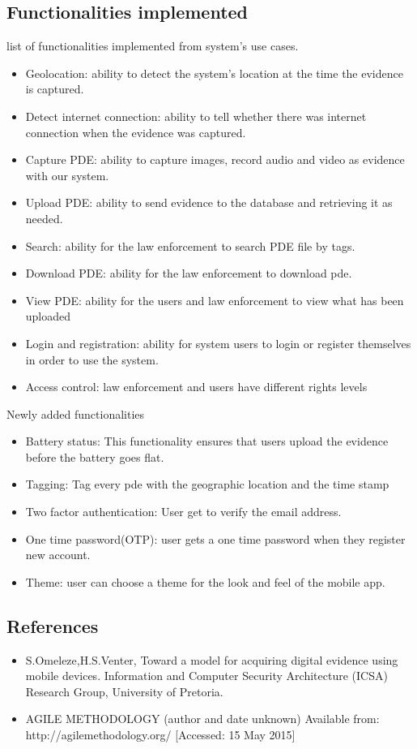 \documentclass[a4paper,12pt]{article}
\begin{document}
\subsection{Functionalities implemented}
list of functionalities implemented from system's use cases.
\begin{itemize}
	\item Geolocation: ability to detect the system's location at the time the evidence is captured.
	\item Detect internet connection: ability to tell whether there was internet connection when the evidence was captured.
	\item Capture PDE: ability to capture images, record audio and video as evidence with our system.
	\item Upload PDE: ability to send evidence to the database and retrieving it as needed.
	\item Search: ability for the law enforcement to search PDE file by tags.
	\item Download PDE: ability for the law enforcement to download pde.
	\item View PDE: ability for the users and law enforcement to view what has been uploaded
	\item Login and registration: ability for system users to login or register themselves in order to use the system.
	\item Access control: law enforcement and users have different rights levels

\end{itemize}

Newly added functionalities
\begin{itemize}
	\item Battery status: This functionality ensures that users upload the evidence before the battery goes flat.
	\item Tagging: Tag every pde with the geographic location and the time stamp
	\item Two factor authentication: User get to verify the email address.
	\item One time password(OTP): user gets a one time password when they register new account.
	\item Theme: user can choose a theme for the look and feel of the mobile app.
\end{itemize}
\newpage
\subsection{References}
\begin{itemize}
\item S.Omeleze,H.S.Venter, Toward a model for acquiring digital evidence using mobile devices. Information and Computer Security Architecture (ICSA) Research Group, University of Pretoria.
\item AGILE METHODOLOGY (author and date unknown)
	Available from: http://agilemethodology.org/ [Accessed: 15 May 2015]
\end{itemize}
\end{document}
